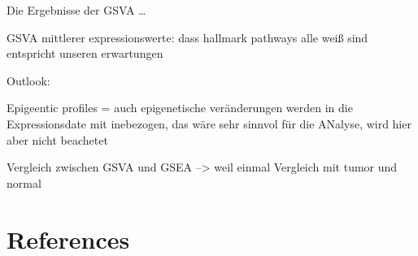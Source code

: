 \documentclass[
  parskip,
  oneside]{scrreprt}
\begin{document}
Die Ergebnisse der GSVA \ldots{}

GSVA mittlerer expressionswerte: dass hallmark pathways alle weiß sind
entspricht unseren erwartungen

Outlook:

Epigeentic profiles = auch epigenetische veränderungen werden in die
Expressionsdate mit inebezogen, das wäre sehr sinnvol für die ANalyse,
wird hier aber nicht beachetet

Vergleich zwischen GSVA und GSEA --\textgreater{} weil einmal Vergleich
mit tumor und normal

\hypertarget{references}{%
\chapter{References}\label{references}}
\end{document}
